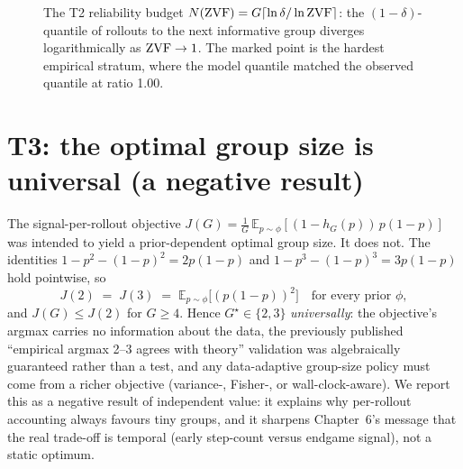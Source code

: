 \begin{figure}[t]
\centering
{}
\caption{The T2 reliability budget
$N(\mathrm{ZVF})=G\lceil\ln\delta/\ln\mathrm{ZVF}\rceil$: the $(1{-}\delta)$-quantile of
rollouts to the next informative group diverges logarithmically as
$\mathrm{ZVF}\to1$. The marked point is the hardest empirical stratum, where the
model quantile matched the observed quantile at ratio 1.00.}
\label{fig:budget}
\end{figure}

\section{T3: the optimal group size is universal (a negative result)}
The signal-per-rollout objective
$J(G)=\tfrac1G\,\mathbb{E}_{p\sim\phi}[(1-h_G(p))\,p(1-p)]$ was intended to
yield a prior-dependent optimal group size. It does not. The identities
$1-p^2-(1-p)^2=2p(1-p)$ and $1-p^3-(1-p)^3=3p(1-p)$ hold pointwise, so
\[
J(2)\;=\;J(3)\;=\;\mathbb{E}_{p\sim\phi}\big[(p(1-p))^2\big]
\quad\text{for every prior } \phi,
\]
and $J(G)\le J(2)$ for $G\ge4$. Hence $G^\star\in\{2,3\}$ \emph{universally}:
the objective's argmax carries no information about the data, the previously
published ``empirical argmax 2--3 agrees with theory'' validation was
algebraically guaranteed rather than a test, and any data-adaptive
group-size policy must come from a richer objective (variance-, Fisher-, or
wall-clock-aware). We report this as a negative result of independent value:
it explains why per-rollout accounting always favours tiny groups, and it
sharpens Chapter~6's message that the real trade-off is temporal (early
step-count versus endgame signal), not a static optimum.

